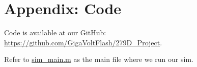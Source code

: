\appendix
\section{Appendix: Code}


Code is available at our GitHub: \href{https://github.com/GigaVoltFlash/279D_Project}{https://github.com/GigaVoltFlash/279D\_Project}.

Refer to \href{https://github.com/GigaVoltFlash/279D_Project/blob/main/sim/sim_main.m}{sim\_main.m} as the main file where we run our sim.
